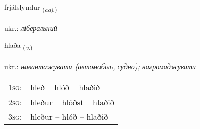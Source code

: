 \documentclass[frontgrid, backgrid]{flacards}\usepackage[]{graphicx}\usepackage[]{xcolor}
\begin{document}
\renewcommand{\flhead}{\vskip5pt \fboxsep=0pt {\small\bfseries\footnotesize Lýsingarorð | прикметник}}
\renewcommand{\fcfoot}{\vskip5pt \fboxsep=0pt \hspace{2pt}{\small\bfseries\footnotesize 3K}}

\renewcommand{\blhead}{\vskip5pt {\small\bfseries\footnotesize Lýsingarorð | прикметник }}
\renewcommand{\bcfoot}{\vskip5pt \hspace{2pt}{\small\bfseries\footnotesize 3K}}


{frjálslyndur \small{\textsubscript{(\textit{adj.})}} \\[1ex] %
\textphonetic{[frjaulstlɪntʏr]} \\
ukr.: \emph{ліберальний} \\  [2ex]
\renewcommand*{\arraystretch}{0.8}
}

\renewcommand{\flhead}{\vskip5pt \fboxsep=0pt {\small\bfseries\footnotesize Sagnorð | дієслово}}
\renewcommand{\fcfoot}{\vskip5pt \fboxsep=0pt \hspace{2pt}{\small\bfseries\footnotesize 3K}}

\renewcommand{\blhead}{\vskip5pt {\small\bfseries\footnotesize Sagnorð | дієслово }}
\renewcommand{\bcfoot}{\vskip5pt \hspace{2pt}{\small\bfseries\footnotesize 3K}}


{hlaða \small{\textsubscript{(\textit{v.})}} \\[1ex] %
\textphonetic{[l̥aːða]} \\
ukr.: \emph{навантажувати (автомобіль, судно); нагромаджувати} \\  [2ex]
\renewcommand*{\arraystretch}{0.8}
\begin{tabular}{p{1cm}l}
\textsc{1sg}: & hleð -- hlóð -- hlaðið \\ 
\textsc{2sg}: & hleður -- hlóðst -- hlaðið \\ 
\textsc{3sg}: & hleður -- hlóð -- hlaðið \\ 
\end{tabular}
}
\end{document}
